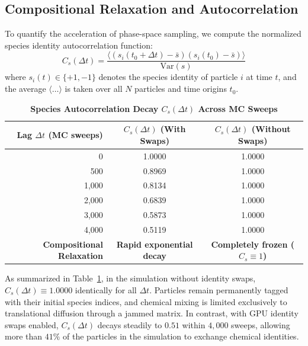 \documentclass[11pt,a4paper]{article}
\begin{document}
\subsection{Compositional Relaxation and Autocorrelation}

To quantify the acceleration of phase-space sampling, we compute the normalized species identity autocorrelation function:
\begin{equation}
    C_s(\Delta t) = \frac{\langle (s_i(t_0 + \Delta t) - \bar{s})(s_i(t_0) - \bar{s}) \rangle}{\text{Var}(s)}
\end{equation}
where $s_i(t) \in \{+1, -1\}$ denotes the species identity of particle $i$ at time $t$, and the average $\langle \dots \rangle$ is taken over all $N$ particles and time origins $t_0$.

\begin{table}[h]
\centering
\small
\caption{\textbf{Species Autocorrelation Decay $C_s(\Delta t)$ Across MC Sweeps}}
\label{tab:autocorrelation}
\vspace{0.5em}
\begin{tabular}{rcc}
\toprule
\textbf{Lag $\Delta t$ (MC sweeps)} & \textbf{$C_s(\Delta t)$ (With Swaps)} & \textbf{$C_s(\Delta t)$ (Without Swaps)} \\
\midrule
0     & 1.0000 & 1.0000 \\
500   & 0.8969 & 1.0000 \\
1,000 & 0.8134 & 1.0000 \\
2,000 & 0.6839 & 1.0000 \\
3,000 & 0.5873 & 1.0000 \\
4,000 & 0.5119 & 1.0000 \\
\midrule
\textbf{Compositional Relaxation} & \textbf{Rapid exponential decay} & \textbf{Completely frozen ($C_s \equiv 1$)} \\
\bottomrule
\end{tabular}
\end{table}

As summarized in Table~\ref{tab:autocorrelation}, in the simulation without identity swaps, $C_s(\Delta t) \equiv 1.0000$ identically for all $\Delta t$. Particles remain permanently tagged with their initial species indices, and chemical mixing is limited exclusively to translational diffusion through a jammed matrix. In contrast, with GPU identity swaps enabled, $C_s(\Delta t)$ decays steadily to $0.51$ within $4,000$ sweeps, allowing more than $41\%$ of the particles in the simulation to exchange chemical identities.
\end{document}
